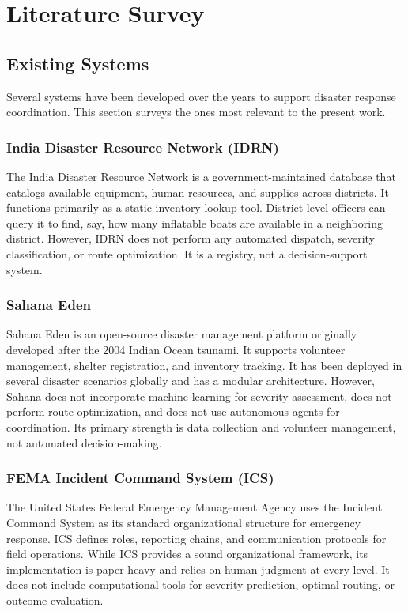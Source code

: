 \chapter{Literature Survey}
\label{ch:literature_survey}

\section{Existing Systems}
\label{sec:existing_systems}

Several systems have been developed over the years to support disaster response coordination. This section surveys the ones most relevant to the present work.

\subsection{India Disaster Resource Network (IDRN)}

The India Disaster Resource Network is a government-maintained database that catalogs available equipment, human resources, and supplies across districts. It functions primarily as a static inventory lookup tool. District-level officers can query it to find, say, how many inflatable boats are available in a neighboring district. However, IDRN does not perform any automated dispatch, severity classification, or route optimization. It is a registry, not a decision-support system.

\subsection{Sahana Eden}

Sahana Eden is an open-source disaster management platform originally developed after the 2004 Indian Ocean tsunami. It supports volunteer management, shelter registration, and inventory tracking. It has been deployed in several disaster scenarios globally and has a modular architecture. However, Sahana does not incorporate machine learning for severity assessment, does not perform route optimization, and does not use autonomous agents for coordination. Its primary strength is data collection and volunteer management, not automated decision-making.

\subsection{FEMA Incident Command System (ICS)}

The United States Federal Emergency Management Agency uses the Incident Command System as its standard organizational structure for emergency response. ICS defines roles, reporting chains, and communication protocols for field operations. While ICS provides a sound organizational framework, its implementation is paper-heavy and relies on human judgment at every level. It does not include computational tools for severity prediction, optimal routing, or outcome evaluation.

